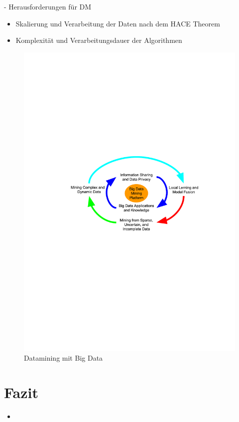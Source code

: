 \documentclass[fleqn,11pt,aspectratio=43]{beamer}
\begin{document}
\begin{frame}{\insertsectionhead - Herausforderungen für DM \cite{wu2014data}}
\begin{itemize} 
\item Skalierung und Verarbeitung der Daten nach dem HACE Theorem
\item Komplexität und Verarbeitungsdauer der Algorithmen
\end{itemize}
\vspace{-0.5em}
\begin{figure} %
\includegraphics[scale=0.65,trim={120 340 100 280},clip]{img/bigdata42.pdf}
\caption{Datamining mit Big Data \cite{wu2014data}}
\label{bigdata}
\end{figure}
\end{frame}

\section{Fazit~}
\begin{frame}{\insertsectionhead}
\begin{itemize}
\item 
\end{itemize}
\end{frame}
\end{document}
